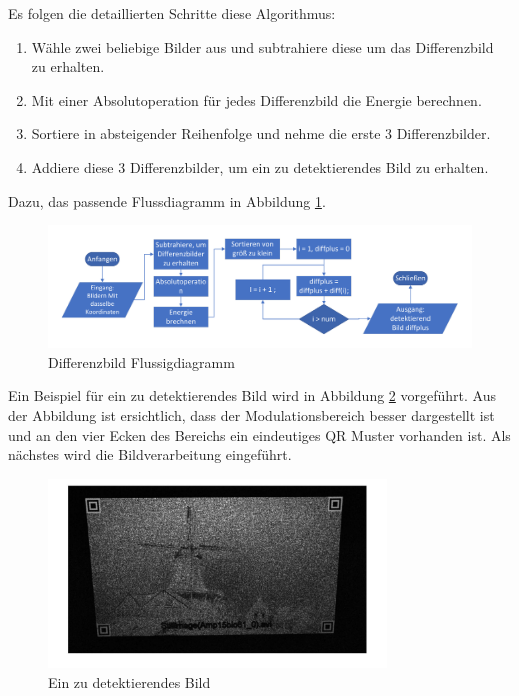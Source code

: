 Es folgen die detaillierten Schritte diese Algorithmus:

\begin{enumerate}
	\item Wähle zwei beliebige Bilder aus und subtrahiere diese um das Differenzbild zu erhalten.
	\item Mit einer Absolutoperation für jedes Differenzbild die Energie berechnen.
	\item Sortiere in absteigender Reihenfolge und nehme die erste 3 Differenzbilder.
	\item Addiere diese 3 Differenzbilder, um ein zu detektierendes Bild zu erhalten.
\end{enumerate}

Dazu, das passende Flussdiagramm in Abbildung \ref{fig:DifferenzbildFlussigdiagramm}.
\begin{figure}[H]
 \centering 
 \includegraphics[keepaspectratio,width=1.1\textwidth]{images/3_Ersteverfahren/Differenzbild/Differenzbildflussigdiagramm.pdf}
 \caption{Differenzbild Flussigdiagramm}
 \label{fig:DifferenzbildFlussigdiagramm}
\end{figure} 

Ein Beispiel für ein zu detektierendes Bild wird in Abbildung \ref{fig:EindetektiertesBild} vorgeführt. Aus der Abbildung ist ersichtlich, dass der Modulationsbereich besser dargestellt ist und an den vier Ecken des Bereichs ein eindeutiges QR Muster vorhanden ist. Als nächstes wird die Bildverarbeitung eingeführt.

\begin{figure}[H]
 \centering 
 \includegraphics[keepaspectratio,width=0.8\textwidth]{images/3_Ersteverfahren/Differenzbild/diffplus.pdf}
 \caption{Ein zu detektierendes Bild}
 \label{fig:EindetektiertesBild}
\end{figure} 


